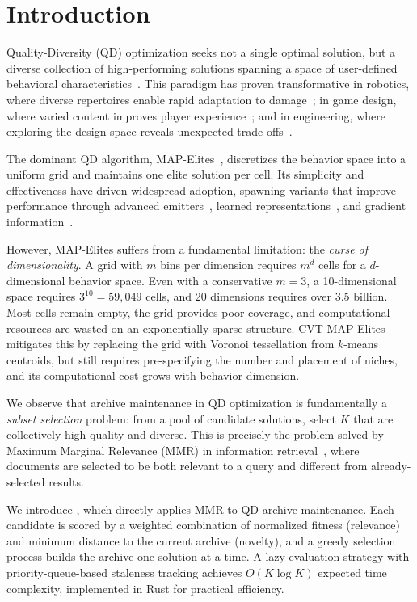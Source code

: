 \section{Introduction}
\label{sec:introduction}

Quality-Diversity (QD) optimization seeks not a single optimal solution, but a diverse collection of high-performing solutions spanning a space of user-defined behavioral characteristics~\cite{pugh2016quality, chatzilygeroudis2021quality}.
This paradigm has proven transformative in robotics, where diverse repertoires enable rapid adaptation to damage~\cite{cully2015robots}; in game design, where varied content improves player experience~\cite{gravina2019procedural}; and in engineering, where exploring the design space reveals unexpected trade-offs~\cite{gaier2018data}.

The dominant QD algorithm, MAP-Elites~\cite{mouret2015illuminating}, discretizes the behavior space into a uniform grid and maintains one elite solution per cell.
Its simplicity and effectiveness have driven widespread adoption, spawning variants that improve performance through advanced emitters~\cite{fontaine2020covariance, colas2020scaling}, learned representations~\cite{paolo2021sparse}, and gradient information~\cite{nilsson2021policy}.

However, MAP-Elites suffers from a fundamental limitation: the \emph{curse of dimensionality}.
A grid with $m$ bins per dimension requires $m^d$ cells for a $d$-dimensional behavior space.
Even with a conservative $m = 3$, a 10-dimensional space requires $3^{10} = 59{,}049$ cells, and 20 dimensions requires over 3.5 billion.
Most cells remain empty, the grid provides poor coverage, and computational resources are wasted on an exponentially sparse structure.
CVT-MAP-Elites~\cite{vassiliades2018using} mitigates this by replacing the grid with Voronoi tessellation from $k$-means centroids, but still requires pre-specifying the number and placement of niches, and its computational cost grows with behavior dimension.

We observe that archive maintenance in QD optimization is fundamentally a \emph{subset selection} problem: from a pool of candidate solutions, select $K$ that are collectively high-quality and diverse.
This is precisely the problem solved by Maximum Marginal Relevance (MMR) in information retrieval~\cite{carbonell1998use}, where documents are selected to be both relevant to a query and different from already-selected results.

We introduce \mmr, which directly applies MMR to QD archive maintenance.
Each candidate is scored by a weighted combination of normalized fitness (relevance) and minimum distance to the current archive (novelty), and a greedy selection process builds the archive one solution at a time.
A lazy evaluation strategy with priority-queue-based staleness tracking achieves $O(K \log K)$ expected time complexity, implemented in Rust for practical efficiency.

